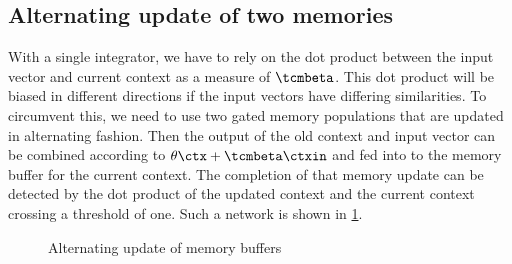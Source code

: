 \subsection{Alternating update of two memories}
With a single integrator, we have to rely on the dot product between the input vector and current context as a measure of $\tcmbeta$.
This dot product will be biased in different directions if the input vectors have differing similarities.
To circumvent this, we need to use two gated memory populations that are updated in alternating fashion.
Then the output of the old context and input vector can be combined according to $\theta \ctx + \tcmbeta \ctxin$ and fed into to the memory buffer for the current context.
The completion of that memory update can be detected by the dot product of the updated context and the current context crossing a threshold of one.
Such a network is shown in \cref{fig:ctx-alt-update}.
\begin{figure}
    \centering
    \caption{Alternating update of memory buffers}\label{fig:ctx-alt-update}
\end{figure}

